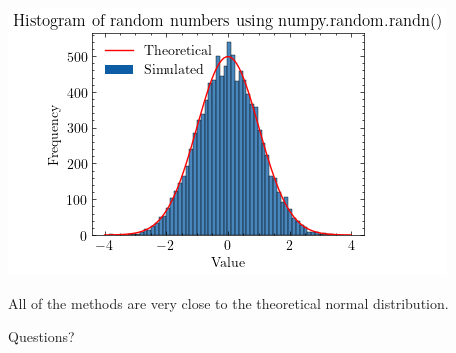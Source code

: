 \documentclass[compress,12pt]{beamer}
\begin{document}
\begin{frame}
\centering
\includegraphics[scale=0.7]{imgs/numpyrandomrv.png}  \\
\begin{tcolorbox}
    All of the methods are very close to the theoretical normal distribution.  
\end{tcolorbox}

\end{frame}



\End
\begin{frame}
      \centering
      Questions?
\end{frame}
\end{document}
